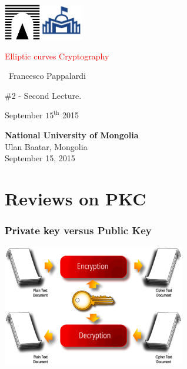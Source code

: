 \documentclass[10pt,handout]{beamer} %
\title[Elliptic curves over $\F_{q}$]{\insertlecture}
\theoremstyle{definition}
\begin{document}
\begin{frame}
\includegraphics[width=1.6cm]{images/roma3.pdf}\hfill\includegraphics[width=1.9cm]{images/NUM2.jpeg}
\vfill

\begin{center}\begin{sc}
\begin{Large}

\textcolor{red}{Elliptic curves Cryptography}
\end{Large}\bigskip

\ {Francesco Pappalardi}\bigskip\bigskip

\begin{large}\begin{bf}\#2 - Second Lecture.
\end{bf}\end{large}\medskip

September $15^{\text{th}}$ 2015\medskip
\vfill
\end{sc}\end{center}

\begin{minipage}[b]{9.3cm}
\textbf{National University of Mongolia}\\  %
Ulan Baatar, Mongolia\\
September 15, 2015
\end{minipage}\hfill
\end{frame}

\section{Reviews on PKC}
\begin{frame}
\frametitle{\textcolor{black}{\textbf{Private key}} versus \alert{Public Key}
}\pause\medskip

\centerline{\includegraphics[width=8cm]{images/figure2.pdf}}

\end{frame}
\end{document}
